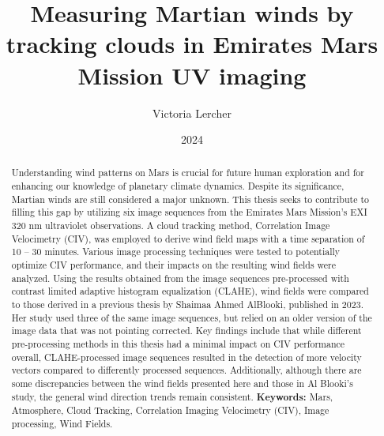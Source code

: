 \documentclass[MSc]{abdnthesis}
\title{Measuring Martian winds by tracking clouds in Emirates Mars Mission UV imaging}
\author{Victoria Lercher}
\date{2024}
\begin{document}
\maketitle
\makedeclaration

\begin{abstract}
Understanding wind patterns on Mars is crucial for future human exploration and for enhancing our knowledge of planetary climate dynamics. Despite its significance, Martian winds are still considered a major unknown. This thesis seeks to contribute to filling this gap by utilizing six image sequences from the Emirates Mars Mission's EXI 320 nm ultraviolet observations. A cloud tracking method, Correlation Image Velocimetry (CIV), was employed to derive wind field maps with a time separation of 10 – 30 minutes. Various image processing techniques were tested to potentially optimize CIV performance, and their impacts on the resulting wind fields were analyzed. 
Using the results obtained from the image sequences pre-processed with contrast limited adaptive histogram equalization (CLAHE), wind fields were compared to those derived in a previous thesis by Shaimaa Ahmed AlBlooki, published in 2023. Her study used three of the same image sequences, but relied on an older version of the image data that was not pointing corrected. Key findings include that while different pre-processing methods in this thesis had a minimal impact on CIV performance overall, CLAHE-processed image sequences resulted in the detection of more velocity vectors compared to differently processed sequences. Additionally, although there are some discrepancies between the wind fields presented here and those in Al Blooki's study, the general wind direction trends remain consistent.
\linebreak
\linebreak
\textbf{Keywords:} Mars, Atmosphere, Cloud Tracking, Correlation Imaging Velocimetry 
(CIV), Image processing, Wind Fields. 
\end{abstract}

\tableofcontents
\listoftables
\listoffigures







\appendix

\end{document}
